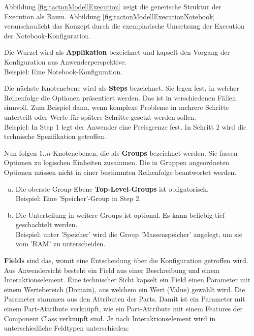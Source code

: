 \documentclass[11pt, a4paper, titlepage, listof=totoc, bibliography=totoc, index=totoc, twoside, openright, headings=normal]{scrreprt}
\begin{document}
Abbildung \ref{fig:tactonModellExecution} zeigt die generische Struktur der Execution als Baum. Abbildung \ref{fig:tactonModellExecutionNotebook} veranschaulicht das Konzept durch die exemplarische Umsetzung der Execution der Notebook-Konfiguration.
\begin{compactitem}
\item Die Wurzel wird als \textbf{Applikation} bezeichnet und kapselt den Vorgang der Konfiguration aus Anwenderperspektive.\\
Beispiel: Eine Notebook-Konfiguration.
\item Die nächste Knotenebene wird als \textbf{Steps} bezeichnet. Sie legen fest, in welcher Reihenfolge die Optionen präsentiert werden. Das ist in verschiedenen Fällen sinnvoll. Zum Beispiel dann, wenn komplexe Probleme in mehrere Schritte unterteilt oder Werte für spätere Schritte gesetzt werden sollen.\\
Beispiel: In Step 1 legt der Anwender eine Preisgrenze fest. In Schritt 2 wird die technische Spezifikation getroffen.
\item  Nun folgen $1..n$ Knotenebenen, die als \textbf{Groups} bezeichnet werden. Sie fassen Optionen zu logischen Einheiten zusammen. Die in Gruppen angeordneten Optionen müssen nicht in einer bestimmten Reihenfolge beantwortet werden.
\begin{enumerate}[(a)]
\item Die oberste Group-Ebene \textbf{Top-Level-Groups} ist obligatorisch.\\
Beispiel: Eine 'Speicher'-Group in Step 2.
\item Die Unterteilung in weitere Groups ist optional. Es kann beliebig tief geschachtelt werden.\\
Beispiel: unter 'Speicher' wird die Group 'Massenspeicher' angelegt, um sie vom 'RAM' zu unterscheiden.
\end{enumerate}
\item \textbf{Fields} sind das, womit eine Entscheidung über die Konfiguration getroffen wird. Aus Anwendersicht besteht ein Field aus einer Beschreibung und einem Interaktionselement. Eine technischer Sicht kapselt ein Field einen Parameter mit einem Wertebereich (Domain), aus welchem ein Wert (Value) gewählt wird. Die Parameter stammen aus den Attributen der Parts. Damit ist ein Parameter mit einem Part-Attribute verknüpft, wie ein Part-Attribute mit einem Features der Component Class verknüpft sind. Je nach Interaktionselement wird in unterschiedliche Feldtypen unterschieden:
\begin{enumerate}[(a)]

\end{enumerate}
\end{compactitem}
\end{document}
